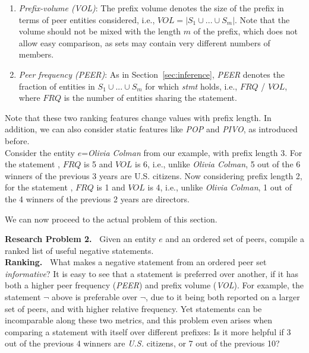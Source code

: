 \begin{enumerate}
    \item \emph{Prefix-volume (VOL)}: The prefix volume denotes the size of the prefix in terms of peer entities considered, i.e., $\textit{VOL}=|S_1 \cup ... \cup S_m|$. Note that the volume should not be mixed with the length $m$ of the prefix, which does not allow easy comparison, as sets may contain very different numbers of members.
    \item \emph{Peer frequency (PEER)}: As in Section~\ref{sec:inference}, \textit{PEER} denotes the fraction of entities in $S_1 \cup ... \cup S_m$ for which \textit{stmt} holds, i.e., $\textit{FRQ}$ / $\textit{VOL}$, where $\textit{FRQ}$ is the number of entities sharing the statement.
\end{enumerate}

Note that these two ranking features change values with prefix length. In addition, we can also consider static features like \textit{POP} and \textit{PIVO}, as introduced before.\\



Consider the entity $e$=\textit{Olivia Colman} from our example, with prefix length 3. For the statement , $\textit{FRQ}$ is 5 and $\textit{VOL}$ is 6, i.e., unlike \emph{Olivia Colman}, 5 out of the 6 winners of the previous 3 years are U.S. citizens. Now considering prefix length 2, for the statement , $\textit{FRQ}$ is 1 and $\textit{VOL}$ is 4, i.e., unlike \emph{Olivia Colman}, 1 out of the 4 winners of the previous 2 years are directors.

We can now proceed to the actual problem of this section.

\medskip

\noindent
\textbf{Research Problem 2.\ }
Given an entity $e$ and an ordered set of peers, compile a ranked list of useful %
negative statements.\\


\noindent
\textbf{Ranking.\ }
What makes a negative statement from an ordered peer set \textit{informative}? It is easy to see that a statement is preferred over another, if it has both a higher peer frequency (\textit{PEER}) and prefix volume (\textit{VOL}). For example, the statement $\neg$ above is preferable over $\neg$, due to it being both reported on a larger set of peers, and with higher relative frequency.  Yet statements can be incomparable along these two metrics, and this problem even arises when comparing a statement with itself over different prefixes: Is it more helpful if 3 out of the previous 4 winners are \textit{U.S.} citizens, or 7 out of the previous 10?

